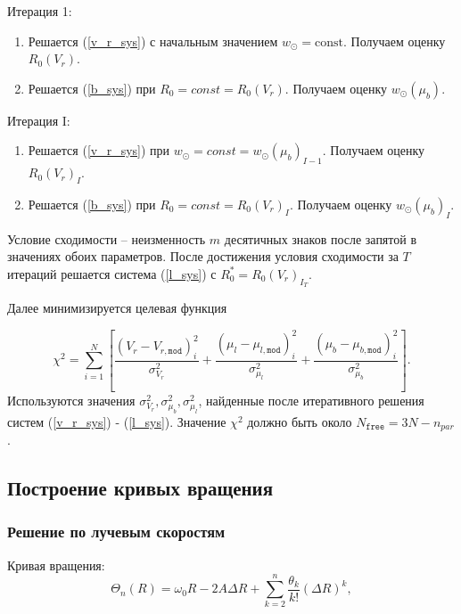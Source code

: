 \documentclass{matmex-diploma-custom}
\begin{document}
Итерация 1:
\begin{enumerate}
        \item Решается (\ref{v_r_sys}) с начальным значением $w_{\odot} = \textrm{const}$. Получаем оценку $R_0(V_r)$.
        \item Решается (\ref{b_sys}) при $R_0 = const = R_0(V_r)$. Получаем оценку $w_{\odot}(\mu_b)$.
\end{enumerate}
\par Итерация I:
\begin{enumerate}
        \item Решается (\ref{v_r_sys}) при $w_{\odot} = const = w_{\odot}(\mu_b)_{I - 1}$. Получаем оценку $R_0(V_r)_I$.
        \item Решается (\ref{b_sys}) при $R_0 = const = R_0(V_r)_I$. Получаем оценку $w_{\odot}(\mu_b)_I$.
\end{enumerate}
Условие сходимости -- неизменность $m$ десятичных знаков после запятой в значениях обоих параметров. После достижения условия сходимости за $T$ итераций решается система (\ref{l_sys}) с $R_0^{*}=R_0(V_r)_{I_T}$.

Далее минимизируется целевая функция

\begin{equation} \label{chi_sq_func}
                \chi^2 = \sum^N_{i = 1} \left[ \frac{\left( V_r - V_{r, \texttt{mod}} \right)^2_i}{\sigma^2_{V_r}} + \frac{\left( \mu_l - \mu_{l, \texttt{mod}} \right)^2_i}{\sigma^2_{\mu_l}} + \frac{\left( \mu_b - \mu_{b, \texttt{mod}} \right)^2_i}{\sigma^2_{\mu_b}} \right].
	\end{equation}
Используются значения $\sigma^2_{V_r}, \sigma^2_{\mu_b}, \sigma^2_{\mu_l}$, найденные после итеративного решения систем (\ref{v_r_sys}) - (\ref{l_sys}). Значение $\chi^2$ должно быть около $N_{\texttt{free}} = 3 N - n_{par}$. 

\pagebreak
\subsection{Построение кривых вращения}
\subsubsection{Решение по лучевым скоростям}
Кривая вращения:
\begin{equation}
        \Theta_n(R) = \omega_0 R - 2A\Delta R + \sum^n_{k = 2} \frac{\theta_k}{k!} \left( \Delta R \right)^k ,
\end{equation}
\end{document}
